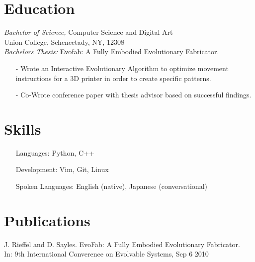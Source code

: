 \documentclass{res} %
\begin{document}
\begin{resume}


\section{Education}

{\sl Bachelor of Science,} Computer Science and Digital Art \\
Union College, Schenectady, NY, 12308 \\
{\sl Bachelors Thesis:} Evofab: A Fully Embodied Evolutionary Fabricator.
\begin{itemize}
\item[-] Wrote an Interactive Evolutionary Algorithm to optimize movement instructions for a 3D printer in order to create specific patterns.
\item[-] Co-Wrote conference paper with thesis advisor based on successful findings.
\end{itemize}
 

\section{Skills} 

\begin{itemize}
\setlength{\itemindent}{-25pt}
\item[] Languages: Python, C++
\item[] Development: Vim, Git, Linux
\item[] Spoken Languages: English (native), Japanese (conversational)
\end{itemize}

 
\section{Publications}
J. Rieffel and D. Sayles. EvoFab: A Fully Embodied Evolutionary Fabricator.  \\In: 9th International Converence on Evolvable Systems, Sep 6 2010 \\


\end{resume}
\end{document}
